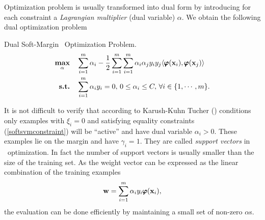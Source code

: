{%
Optimization problem is usually transformed into dual form by introducing for each constraint a \textit{Lagrangian multiplier} (dual variable) $\alpha$.
We obtain the following dual optimization problem
\begin{definition}{Dual Soft-Margin \svm\ Optimization Problem.}\label{softsvmdual}
	\begin{align*}
		\underset{\mathbf {\alpha}}{\textbf{max}} & \quad\sum_{i=1}^{m}\alpha_i -\frac{1}{2}\sum_{i=1}^{m}\sum_{i=1}^{m}\alpha_i\alpha_jy_iy_j\langle \pmb \varphi(\mathbf {x}_i), \pmb \varphi(\mathbf {x}_j) \rangle\\
		\textbf{s.t.} & \quad \sum_{i=1}^{m}\alpha_iy_i=0, \, 0\le\alpha_i\le C, \, \forall i\in\{1,\cdots,m\}.
	\end{align*}
\end{definition}
It is not difficult to verify that according to Karush-Kuhn Tucher (\kkt) conditions only examples with $\xi_i=0$ and satisfying equality constraints (\ref{softsvmconstraint}) will be ``active'' and have dual variable $\alpha_i>0$.
These examples lie on the margin and have $\gamma_i=1$.
They are called \textit{support vectors} in \svm\ optimization.
In fact the number of support vectors is usually smaller than the size of the training set.
As the weight vector can be expressed as the linear combination of the training examples \citep{taylor04}
\begin{align*}
	\mathbf {w} = \sum_{i=1}^{m}\alpha_iy_i\pmb \varphi(\mathbf {x}_i),
\end{align*}
the evaluation can be done efficiently by maintaining a small set of non-zero $\alpha$s.

}
